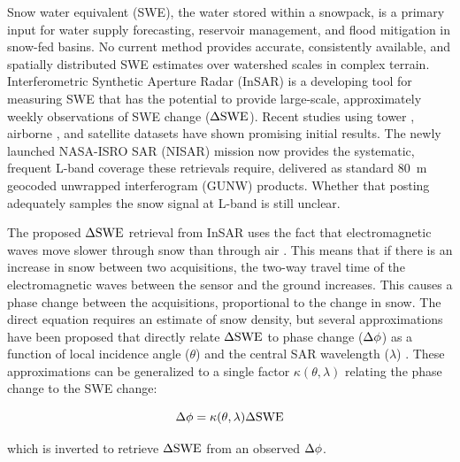 \documentclass[journal abbreviation, manuscript]{copernicus}
\begin{document}
\introduction  %
Snow water equivalent (SWE), the water stored within a snowpack, is a primary input for water supply forecasting, reservoir management, and flood mitigation in snow-fed basins. No current method provides accurate, consistently available, and spatially distributed SWE estimates over watershed scales in complex terrain. Interferometric Synthetic Aperture Radar (InSAR) is a developing tool for measuring SWE that has the potential to provide large-scale, approximately weekly observations of SWE change ($\Delta\mathrm{SWE}$). Recent studies using tower \citep{Leinss2015, Ruiz2021}, airborne \citep{Marshall2021, Nagler2022, Tarricone2023, Hoppinen2023w2, palomaki2025spatiotemporal-df9, Bonnell2024}, and satellite \citep{Belinska2022, Oveisgharan2024, ruiz2024} datasets have shown promising initial results. The newly launched NASA-ISRO SAR (NISAR) mission now provides the systematic, frequent L-band coverage these retrievals require, delivered as standard 80~m geocoded unwrapped interferogram (GUNW) products. Whether that posting adequately samples the snow signal at L-band is still unclear.

The proposed $\Delta\mathrm{SWE}$ retrieval from InSAR uses the fact that electromagnetic waves move slower through snow than through air \citep{Guneriussen2001, Leinss2015}. This means that if there is an increase in snow between two acquisitions, the two-way travel time of the electromagnetic waves between the sensor and the ground increases. This causes a phase change between the acquisitions, proportional to the change in snow. The direct equation requires an estimate of snow density, but several approximations have been proposed that directly relate $\Delta\mathrm{SWE}$ to phase change ($\Delta\phi$) as a function of local incidence angle ($\theta$) and the central SAR wavelength ($\lambda$) \citep{Leinss2015, Oveisgharan2023}. These approximations can be generalized to a single factor $\kappa(\theta,\lambda)$ relating the phase change to the SWE change:

\begin{equation}\label{eq:dswe2dphi}
    \Delta\phi = \kappa (\theta, \lambda) \Delta\mathrm{SWE}
\end{equation}

\noindent which is inverted to retrieve $\Delta\mathrm{SWE}$ from an observed $\Delta\phi$.
\end{document}
